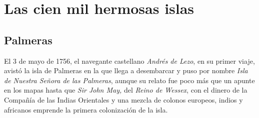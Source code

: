 \chapter{Las cien mil hermosas islas}
\varhrulefill
\section{Palmeras}

El 3 de mayo de 1756, el navegante castellano \emph{Andrés de Lezo}, en su primer viaje, avistó la isla de Palmeras en la que llega a desembarcar y puso por nombre \emph{Isla de Nuestra Señora de las Palmeras}, aunque su relato fue poco más que un apunte en los mapas hasta que \emph{Sir John May,} del \emph{Reino de Wessex}, con el dinero de la Compañía de las Indias Orientales y una mezcla de colonos europeos, indios y africanos emprende la primera colonización de la isla.